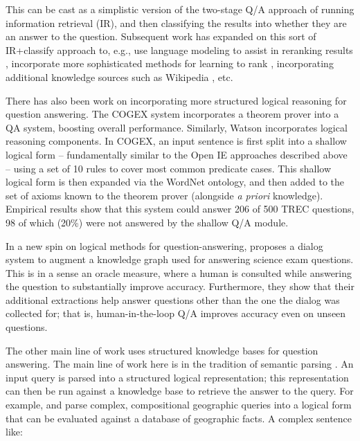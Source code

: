 This can be cast as a simplistic version of the two-stage Q/A approach of running information
  retrieval (IR), and then classifying the results into whether they are an answer to the
  question.
Subsequent work has expanded on this sort of IR+classify approach to, e.g., use language
  modeling to assist in reranking results \cite{key:2006chen-trec}, incorporate
  more sophisticated methods for learning to rank \cite{key:2007cao-trec},
  incorporating additional knowledge sources such as Wikipedia \cite{key:2004ahn-trec},
  etc.

There has also been work on incorporating more structured logical
  reasoning for question answering.
The COGEX system \cite{key:2003moldovan-trec} incorporates a theorem
  prover into a QA system, boosting overall performance.
Similarly, Watson \cite{key:2010ferrucci-watson} incorporates
  logical reasoning components.
In COGEX, an input sentence is first split into a shallow logical form -- fundamentally
  similar to the Open IE approaches described above -- using a set of 10 rules to cover
  most common predicate cases.
This shallow logical form is then expanded via the WordNet ontology, and then added
  to the set of axioms known to the theorem prover (alongside \textit{a priori} knowledge).
Empirical results show that this system could answer 206 of 500 TREC questions, 98 of which
  (20\%) were not answered by the shallow Q/A module.

In a new spin on logical methods for question-answering,
   proposes
  a dialog system to augment a knowledge graph used for answering science exam
  questions.
This is in a sense an oracle measure, where a human is consulted while answering
  the question to substantially improve accuracy.
Furthermore, they show that their additional extractions help
  answer questions other than the one the dialog was collected for;
  that is, human-in-the-loop Q/A improves accuracy even on unseen questions.

The other main line of work uses structured knowledge bases for question answering.
The main line of work here is in the tradition of semantic parsing
  \cite{key:2005kate-semantics,key:2005zettlemoyer-semantics,key:2011liang-semantics}.
An input query is parsed into a structured logical representation; this representation
  can then be run against a knowledge base to retrieve the answer to the query.
For example,  and  
  parse complex, compositional geographic
  queries into a logical form that can be evaluated against a database of geographic facts.
A complex sentence like:

